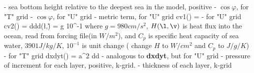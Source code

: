  - sea bottom height relative to the deepest sea in the model, positive
 - $\cos \varphi$, for "T" grid
 - $\cos \varphi$, for "U" grid
  - metric term, for "U" grid
   \be
   cv1(\varphi) = 
   \ee
{}  - for "U" grid
   \be
   cv2(\varphi) = 
   \ee
{}
   \be
   ddd(\l,\v) = g  10^{-1}
   \ee
   where $g=980cm/s^2$, $H(\l,\v)$ is heat flux into the ocean, read from
   forcing file(in $W/m^2$), and $C_p$ is specific heat capacity of sea water, 
   $3901 J/kg/K$, $10^{-1}$ is unit change ( change $H$ to $W/cm^2$ and
   $C_p$ to $J/g/K$)
 - for "T" grid
   \be
   dxdyt(\varphi) = a^2 \cos\varphi d\lambda d\varphi 
   \ee
{} - analogous to \textbf{dxdyt}, but for "U" grid
 - pressure of increment for each layer, positive, k-grid.
 - thickness of each layer, k-grid

